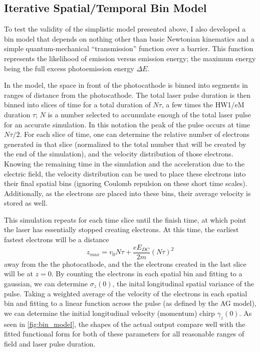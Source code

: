\subsection{Iterative Spatial/Temporal Bin Model} \label{sec:bin_model}

To test the validity of the simplistic model presented above, I also developed a bin model that depends on nothing other than basic Newtonian kinematics and a simple quantum-mechanical ``transmission'' function over a barrier.
This function represents the likelihood of emission versus emission energy; the maximum energy being the full excess photoemission energy $\Delta E$.

In the model, the space in front of the photocathode is binned into segments in ranges of distance from the photocathode.
The total laser pulse duration is then binned into slices of time for a total duration of $N \tau$, a few times the HW1/eM duration $\tau$; $N$ is a number selected to accumulate enough of the total laser pulse for an accurate simulation.
In this notation the peak of the pulse occurs at time $N \tau / 2$.
For each slice of time, one can determine the relative number of electrons generated in that slice (normalized to the total number that will be created by the end of the simulation), and the velocity distribution of those electrons.
Knowing the remaining time in the simulation and the acceleration due to the electric field, the velocity distribution can be used to place these electrons into their final spatial bins (ignoring Coulomb repulsion on these short time scales).
Additionally, as the electrons are placed into these bins, their average velocity is stored as well.

This simulation repeats for each time slice until the finish time, at which point the laser has essentially stopped creating electrons.
At this time, the earliest fastest electrons will be a distance 
\begin{equation}
  z_{max} = v_0 N \tau + \frac{e E_{ DC }}{2 m} (N \tau)^2 
\end{equation}
away from the the photocathode, and the the electrons created in the last slice will be at $z=0$.
By counting the electrons in each spatial bin and fitting to a gaussian, we can determine $\sigma_z(0)$, the inital longitudinal spatial variance of the pulse.
Taking a weighted average of the velocity of the electrons in each spatial bin and fitting to a linear function across the pulse (as defined by the AG model), we can determine the initial longitudinal velocity (momentum) chirp $\gamma_z(0)$.
As seen in \ref{fig:bin_model}, the shapes of the actual output compare well with the fitted functional form for both of these parameters for all reasonable ranges of field and laser pulse duration.


